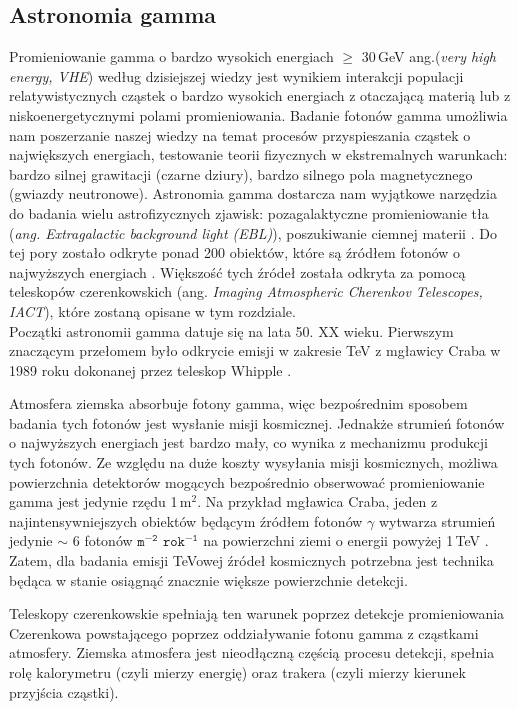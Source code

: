 \documentclass[a4paper,11pt,twoside]{article}
\begin{document}
\subsection{Astronomia gamma}
Promieniowanie gamma o bardzo wysokich energiach $\geq$ 30\,GeV ang.(\textsl{very high energy, VHE}) według dzisiejszej wiedzy jest wynikiem interakcji populacji relatywistycznych cząstek o bardzo wysokich energiach z otaczającą materią lub z niskoenergetycznymi polami promieniowania. Badanie fotonów gamma umożliwia nam poszerzanie naszej wiedzy na temat procesów przyspieszania cząstek o największych energiach, testowanie teorii fizycznych w ekstremalnych warunkach: bardzo silnej grawitacji (czarne dziury), bardzo silnego pola magnetycznego (gwiazdy neutronowe). Astronomia gamma dostarcza nam wyjątkowe narzędzia do badania wielu astrofizycznych zjawisk: pozagalaktyczne promieniowanie tła (\textsl{ang. Extragalactic background light (EBL)}), poszukiwanie ciemnej materii \cite{Gamma-ray_article}. Do tej pory zostało odkryte ponad 200 obiektów, które są źródłem fotonów o najwyższych energiach \cite{TeVCat}. Większość tych źródeł została odkryta za pomocą teleskopów czerenkowskich (ang. \textsl{Imaging Atmospheric Cherenkov Telescopes, IACT}), które zostaną opisane w tym rozdziale.\\
Początki astronomii gamma datuje się na lata 50. XX wieku.
Pierwszym znaczącym przełomem było odkrycie emisji w zakresie TeV z mgławicy Craba w 1989 roku dokonanej przez teleskop Whipple \cite{whipple}.

Atmosfera ziemska absorbuje fotony gamma, więc bezpośrednim sposobem badania tych fotonów jest wysłanie misji kosmicznej. Jednakże strumień fotonów o najwyższych energiach jest bardzo mały, co wynika z mechanizmu produkcji tych fotonów. Ze względu na duże koszty wysyłania misji kosmicznych, możliwa powierzchnia detektorów mogących bezpośrednio obserwować promieniowanie gamma jest jedynie rzędu 1\,m$^2$.
Na przykład mgławica Craba, jeden z najintensywniejszych obiektów będącym źródłem fotonów $\gamma$ wytwarza strumień jedynie $\sim$ 6 fotonów $\mathtt{m^{-2}}$ $\mathtt{rok^{-1}}$ na powierzchni ziemi o energii powyżej 1\,TeV \cite{IACT}.
Zatem, dla badania emisji TeVowej źródeł kosmicznych potrzebna jest technika będąca w stanie osiągnąć znacznie większe powierzchnie detekcji. 

Teleskopy czerenkowskie spełniają ten warunek poprzez detekcje promieniowania Czerenkowa powstającego poprzez oddziaływanie fotonu gamma z cząstkami atmosfery. Ziemska atmosfera jest nieodłączną częścią procesu detekcji, spełnia rolę kalorymetru (czyli mierzy energię) oraz trakera (czyli mierzy kierunek przyjścia cząstki). \\
\end{document}
